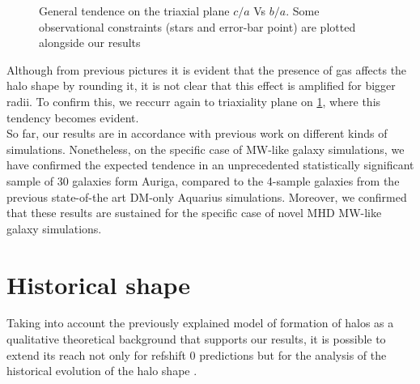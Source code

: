 \begin{figure}[!ht]
  \hfill
  \caption{General tendence on the triaxial plane $c/a$ Vs $b/a$. Some observational constraints (stars and error-bar point) are plotted alongside our results}
  \label{fig:Triaxiality_DM_MHD}
\end{figure}

Although from previous pictures it is evident that the presence of gas affects the halo shape by rounding it, it is not clear that this effect is amplified for bigger radii. To confirm this, we reccurr again to triaxiality plane on \ref{fig:Triaxiality_DM_MHD}, where this tendency becomes evident.\\


So far, our results are in accordance with previous work on different kinds of simulations. Nonetheless, on the specific case of MW-like galaxy simulations, we have confirmed the expected tendence in an unprecedented statistically significant sample of 30 galaxies form Auriga, compared to the 4-sample galaxies from the previous state-of-the art DM-only Aquarius simulations. Moreover, we confirmed that these results are sustained for the specific case of novel MHD MW-like galaxy simulations.\\

\section{Historical shape}
Taking into account the previously explained model of formation of halos as a qualitative theoretical background that supports our results, it is possible to extend 
its reach not only for refshift 0 predictions but for the analysis of the historical evolution of the halo shape \cite{}.\\

